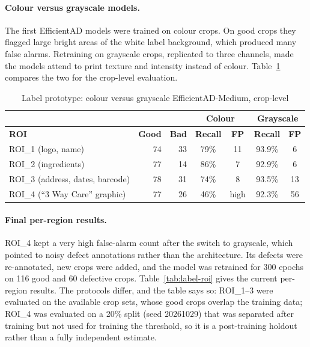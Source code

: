 \paragraph{Colour versus grayscale models.} The first EfficientAD models were trained on colour crops. On good crops they flagged large bright areas of the white label background, which produced many false alarms. Retraining on grayscale crops, replicated to three channels, made the models attend to print texture and intensity instead of colour. Table~\ref{tab:label-colour} compares the two for the crop-level evaluation.

\begin{table}[htbp]
\centering
\caption{Label prototype: colour versus grayscale EfficientAD-Medium, crop-level}
\label{tab:label-colour}
\footnotesize
\begin{tabular}{|l|r|r|c|c|c|c|}
\hline
 & & & \multicolumn{2}{c|}{\textbf{Colour}} & \multicolumn{2}{c|}{\textbf{Grayscale}} \\ \hline
\textbf{ROI} & \textbf{Good} & \textbf{Bad} & \textbf{Recall} & \textbf{FP} & \textbf{Recall} & \textbf{FP} \\ \hline
ROI\_1 (logo, name) & 74 & 33 & 79\% & 11 & 93.9\% & 6 \\ \hline
ROI\_2 (ingredients) & 77 & 14 & 86\% & 7 & 92.9\% & 6 \\ \hline
ROI\_3 (address, dates, barcode) & 78 & 31 & 74\% & 8 & 93.5\% & 13 \\ \hline
ROI\_4 (``3 Way Care'' graphic) & 77 & 26 & 46\% & high & 92.3\% & 56 \\ \hline
\end{tabular}
\end{table}

\paragraph{Final per-region results.} ROI\_4 kept a very high false-alarm count after the switch to grayscale, which pointed to noisy defect annotations rather than the architecture. Its defects were re-annotated, new crops were added, and the model was retrained for 300 epochs on 116 good and 60 defective crops. Table~\ref{tab:label-roi} gives the current per-region results. The protocols differ, and the table says so: ROI\_1--3 were evaluated on the available crop sets, whose good crops overlap the training data; ROI\_4 was evaluated on a 20\% split (seed 20261029) that was separated after training but not used for training the threshold, so it is a post-training holdout rather than a fully independent estimate.

